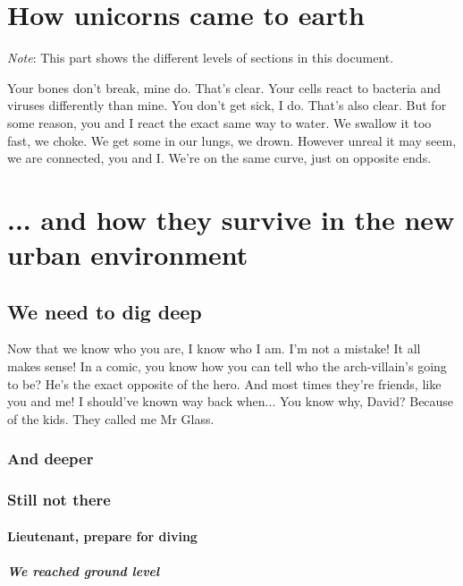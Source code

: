 
\section{How unicorns came to earth}
\emph{Note}: This part shows the different levels of sections in this document.

Your bones don't break, mine do. That's clear. Your cells react to bacteria and viruses differently than mine. You don't get sick, I do. That's also clear. But for some reason, you and I react the exact same way to water. We swallow it too fast, we choke. We get some in our lungs, we drown. However unreal it may seem, we are connected, you and I. We're on the same curve, just on opposite ends.

\section{... and how they survive in the new urban environment}
\subsection{We need to dig deep}
Now that we know who you are, I know who I am. I'm not a mistake! It all makes sense! In a comic, you know how you can tell who the arch-villain's going to be? He's the exact opposite of the hero. And most times they're friends, like you and me! I should've known way back when... You know why, David? Because of the kids. They called me Mr Glass.

\subsubsection{And deeper}
\subsubsection{Still not there}
\paragraph{Lieutenant, prepare for diving}
\subparagraph{We reached ground level}
